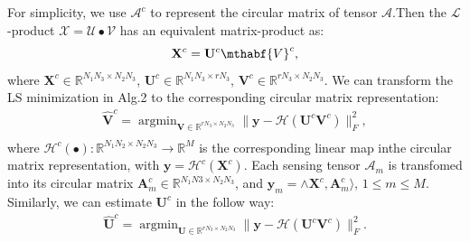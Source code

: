 \documentclass[journal,article,submit,moreauthors,pdftex,10pt,a4paper]{Definitions/mdpi}
\theoremstyle{plain}
\theoremstyle{definition}
\theoremstyle{remark}
\begin{document}
For simplicity, we use $\mathcal{A}^c$ to represent the circular matrix of tensor $\mathcal{A}$.Then the $\mathcal{L}$-product $\mathcal{X} = \mathcal{U} \bullet \mathcal{V}$ has an equivalent matrix-product as:
\begin{equation}
    \mathbf{X}^c = \mathbf{U}^c\mthabf{V}^c,
\end{equation}
where $\mathbf{X}^c \in \mathbb{R}^{N_1N_3\times N_2N_3}$, $\mathbf{U}^c \in \mathbb{R}^{N_1N_3\times rN_3}$, $\mathbf{V}^c \in \mathbb{R}^{rN_3\times N_2N_3}$. We can transform the LS minimization in Alg.2 to the corresponding circular matrix representation:
\begin{eqnarray*}
    \widehat{\mathbf{V}}^c = 
    \mathop{\arg\min}_{ \mathbf{V} \in \mathbb{R}^{rN_3 \times N_2N_3}} \| \mathbf{y} - \mathcal{H}(\mathbf{U}^c\mathbf{V}^c) \|_F^2 , \\
\end{eqnarray*}
where $\mathcal{H}^c(\bullet): \mathbb{R}^{N_1N_2 \times N_2N_3} \to \mathbb{R}^M$ is the corresponding linear map inthe circular matrix representation, with $\mathbf{y} = \mathcal{H}^c(\mathbf{X}^c)$. Each sensing tensor $\mathcal{A}_m$ is transfomed into its circular matrix $\mathbf{A}^c_m \in \mathbb{R}^{N_1N3 \times N_2N_3}$, and $\mathbf{y}_m = \land \mathbf{X}^c, \mathbf{A}^c_m \rangle$, $1 \leq m \leq M$. Similarly, we can estimate $\mathbf{U}^c$ in the follow way:
\begin{eqnarray*}
    \widehat{\mathbf{U}}^c =
    \mathop{\arg\min}_{ \mathbf{U} \in \mathbb{R}^{rN_3 \times N_2N_3}} \| \mathbf{y} - \mathcal{H}(\mathbf{U}^c\mathbf{V}^c) \|_F^2 . \\
\end{eqnarray*}
\end{document}
